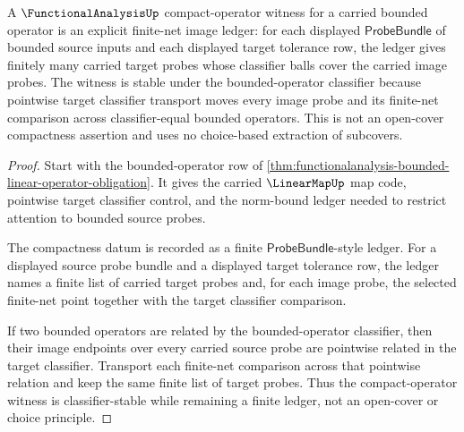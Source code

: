 \begin{theorem}
\label{thm:functionalanalysis-compact-operator-ledger-obligation}
A $\FunctionalAnalysisUp$ compact-operator witness for a carried bounded
operator is an explicit finite-net image ledger: for each displayed
$\mathsf{ProbeBundle}$ of bounded source inputs and each displayed target tolerance
row, the ledger gives finitely many carried target probes whose classifier
balls cover the carried image probes. The witness is stable under the
bounded-operator classifier because pointwise target classifier transport
moves every image probe and its finite-net comparison across classifier-equal
bounded operators. This is not an open-cover compactness assertion and uses
no choice-based extraction of subcovers.
\end{theorem}
\begin{proof}
Start with the bounded-operator row of
\autoref{thm:functionalanalysis-bounded-linear-operator-obligation}. It gives
the carried $\LinearMapUp$ map code, pointwise target classifier control, and
the norm-bound ledger needed to restrict attention to bounded source probes.

The compactness datum is recorded as a finite $\mathsf{ProbeBundle}$-style ledger.
For a displayed source probe bundle and a displayed target tolerance row, the
ledger names a finite list of carried target probes and, for each image probe,
the selected finite-net point together with the target classifier comparison.

If two bounded operators are related by the bounded-operator classifier, then
their image endpoints over every carried source probe are pointwise related in
the target classifier. Transport each finite-net comparison across that
pointwise relation and keep the same finite list of target probes. Thus the
compact-operator witness is classifier-stable while remaining a finite ledger,
not an open-cover or choice principle.
\end{proof}


